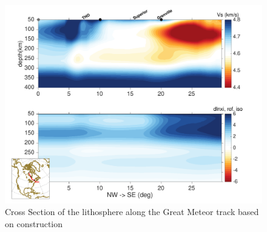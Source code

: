 \documentclass[12pt]{article}
\begin{document}
	\begin{figure}
		\centerline{\includegraphics[width=\linewidth]{figures/profiles_NASEM3_vs_dxi_GMTrack.pdf}}

		\caption{Cross Section of the lithosphere along the Great Meteor track based on \cite{heaman2000timing} construction}
		\label{gmtcross}

	\end{figure}
\end{document}
